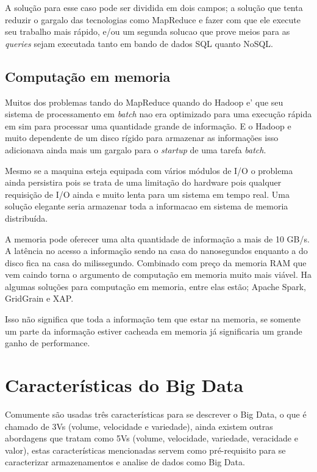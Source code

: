 A solução para esse caso pode ser dividida em dois campos; a solução que tenta reduzir o gargalo das tecnologias como MapReduce e fazer com que ele execute seu trabalho mais rápido, e/ou um segunda solucao que prove meios para as \textit{queries} sejam executada tanto em bando de dados SQL quanto NoSQL.~\cite{realtime}

\subsection{Computação em memoria}

Muitos dos problemas tando do MapReduce quando do Hadoop e' que seu sistema de processamento em \textit{batch} nao era optimizado para uma execução rápida em sim para processar uma quantidade grande de informação. E o Hadoop e muito dependente de um disco rígido para armazenar as informações isso adicionava ainda mais um gargalo para o \textit{startup} de uma tarefa \textit{batch}.

Mesmo se a maquina esteja equipada com vários módulos de I/O o problema ainda persistira pois se trata de uma limitação do hardware pois qualquer requisição de I/O ainda e muito lenta para um sistema em tempo real. Uma solução elegante seria armazenar toda a informacao em sistema de memoria distribuída.

A memoria pode oferecer uma alta quantidade de informação a mais de 10 GB/s. A latência no acesso a informação sendo na casa do nanosegundos enquanto a do disco fica na casa do milissegundo. Combinado com preço da memoria RAM que vem caindo torna o argumento de computação em memoria muito mais viável. Ha algumas soluções para computação em memoria, entre elas estão; Apache Spark, GridGrain e XAP.

Isso não significa que toda a informação tem que estar na memoria, se somente um parte da informação estiver cacheada em memoria já significaria um grande ganho de performance.~\cite{realtime}

\section{Características do Big Data}
\label{sec:funcbigdata}
Comumente são usadas três características para se descrever o Big Data, o que é chamado de 3Vs (volume, velocidade e variedade), ainda existem outras abordagens que tratam como 5Vs (volume, velocidade, variedade, veracidade e valor), estas características mencionadas servem como pré-requisito para se caracterizar armazenamentos e analise de dados como Big Data.

